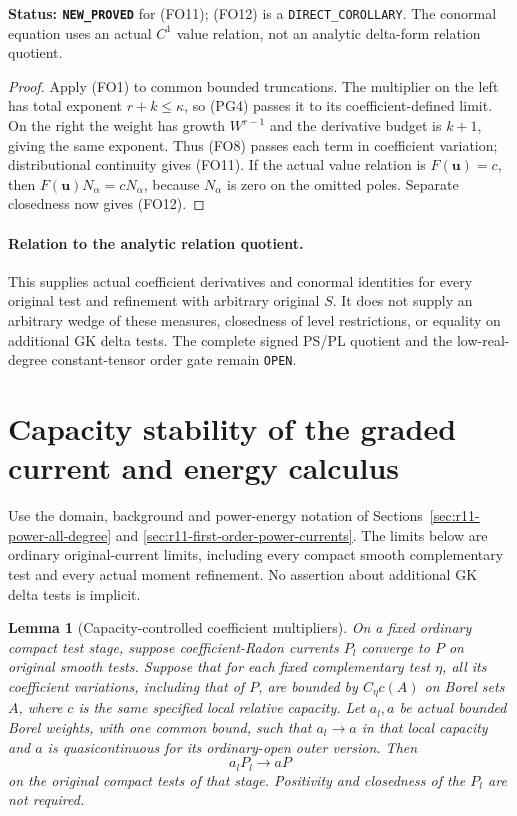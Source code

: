 \documentclass[11pt,a4paper]{article}
\numberwithin{equation}{section}
\newtheorem{lemma}[theorem]{Lemma}
\theoremstyle{definition}
\theoremstyle{remark}
\begin{document}
\noindent\textbf{Status: \texttt{NEW\_PROVED}} for
(FO11); (FO12) is a \texttt{DIRECT\_COROLLARY}.
The conormal equation uses an actual $C^1$ value
relation, not an analytic delta-form relation quotient.

\begin{proof}
Apply (FO1) to common bounded truncations. The multiplier
on the left has total exponent $r+k\leq\kappa$, so
(PG4) passes it to its coefficient-defined limit.
On the right the weight has growth $W^{r-1}$ and the
derivative budget is $k+1$, giving the same exponent.
Thus (FO8) passes each term in coefficient variation;
distributional continuity gives (FO11).
If the actual value relation is $F(\mathbf u)=c$,
then $F(\mathbf u)N_\alpha=cN_\alpha$, because
$N_\alpha$ is zero on the omitted poles.
Separate closedness now gives (FO12).
\end{proof}

\paragraph{Relation to the analytic relation quotient.}
This supplies actual coefficient derivatives and conormal
identities for every original test and refinement with
arbitrary original $S$. It does not supply an arbitrary
wedge of these measures, closedness of level restrictions,
or equality on additional GK delta tests. The complete
signed PS/PL quotient and the low-real-degree constant-tensor
order gate remain \texttt{OPEN}.



\section{Capacity stability of the graded current and energy calculus}
\label{sec:r11-graded-capacity-stability}

Use the domain, background and power-energy notation of
Sections~\ref{sec:r11-power-all-degree} and
\ref{sec:r11-first-order-power-currents}.
The limits below are ordinary original-current limits,
including every compact smooth complementary test and
every actual moment refinement. No assertion about
additional GK delta tests is implicit.

\begin{lemma}[Capacity-controlled coefficient multipliers]
\label{lem:r11-general-coefficient-capacity-multiplier}
On a fixed ordinary compact test stage, suppose
coefficient-Radon currents $P_l$ converge to $P$ on
original smooth tests. Suppose that for each fixed
complementary test $\eta$, all its coefficient variations,
including that of $P$, are bounded by $C_\eta c(A)$ on
Borel sets $A$, where $c$ is the same specified local
relative capacity. Let $a_l,a$ be actual bounded Borel
weights, with one common bound, such that $a_l\to a$ in
that local capacity and $a$ is quasicontinuous for its
ordinary-open outer version. Then
\[
                         a_lP_l\longrightarrow aP
 \tag{GS1}
\]
on the original compact tests of that stage.
Positivity and closedness of the $P_l$ are not required.
\end{lemma}
\end{document}
